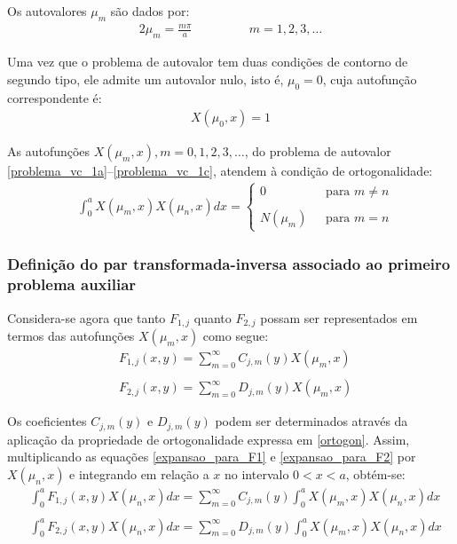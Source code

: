 Os autovalores $\mu_m$ são dados por:
\begin{alignat}{2}
	\mu_m = \frac{m\pi}{a} \quad\quad\quad && m = 1,2,3,\ldots
\end{alignat}

Uma vez que o problema de autovalor tem duas condições de contorno de segundo tipo, ele admite um autovalor nulo, isto é, $\mu_0 = 0$, cuja autofunção correspondente é:
\begin{align}
X(\mu_0, x) = 1
\end{align}

As autofunções $X(\mu_m, x), m=0,1,2,3,\ldots$, do problema de autovalor \eqref{problema_vc_1a}--\eqref{problema_vc_1c}, atendem à condição de ortogonalidade:
\begin{align}
& \int_0^a X(\mu_m, x)X(\mu_n, x)dx 
= \left\lbrace
	\begin{array}{ll}
		0 \quad\quad\quad\quad & \text{para  } m \neq n \\ \\
		N(\mu_m) & \text{para  }m = n
	\end{array}
\right. \label{ortogon}
\end{align}

\subsubsection{Definição do par transformada-inversa associado ao primeiro problema auxiliar}

Considera-se agora que tanto $F_{1, j}$ quanto $F_{2, j}$ possam ser representados em termos das autofunções $X(\mu_m, x)$ como segue:
\begin{align}
	& F_{1, j}(x, y) = \sum_{m=0}^\infty C_{j,m}(y)X(\mu_m, x) \label{expansao_para_F1}\\ \nonumber \\
	& F_{2, j}(x, y) = \sum_{m=0}^\infty D_{j,m}(y)X(\mu_m, x) \label{expansao_para_F2}
\end{align}

Os coeficientes $C_{j,m}(y)$ e $D_{j,m}(y)$ podem ser determinados através da aplicação da propriedade de ortogonalidade expressa em \eqref{ortogon}. Assim, multiplicando as equações
\eqref{expansao_para_F1} e \eqref{expansao_para_F2} por $X(\mu_n, x)$ e integrando em relação a $x$ no intervalo $0 < x < a$, obtém-se:
\begin{align}
	& \int_0^a F_{1, j}(x, y)X(\mu_n, x)dx = \sum_{m=0}^\infty C_{j,m}(y) \int_0^a X(\mu_m, x)X(\mu_n, x)dx \label{somatorio_para_F1}\\ \nonumber \\
	& \int_0^a F_{2, j}(x, y)X(\mu_n, x)dx = \sum_{m=0}^\infty D_{j,m}(y) \int_0^a X(\mu_m, x)X(\mu_n, x)dx \label{somatorio_para_F2}
\end{align}

